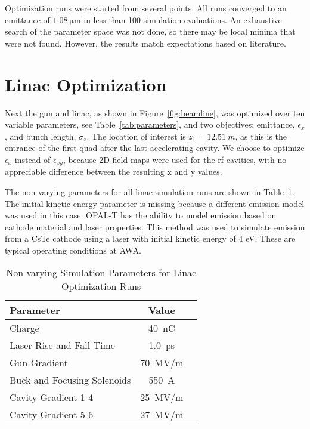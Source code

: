 \documentclass[letterpaper,  %
              ]{jacow}
\begin{document}
Optimization runs were started from several points. 
All runs converged to an emittance of 
$\SI{1.08}{\um}$ in less than 100 simulation evaluations. 
An exhaustive search of the parameter space was not done, 
so there may be local minima that were not found.
However, the results match expectations based on literature.

\section{Linac Optimization} 
Next the gun and linac, as shown in Figure~\ref{fig:beamline}, 
was optimized over ten variable parameters, see Table~\ref{tab:parameters}, 
and two objectives: emittance, $\epsilon_x$, and bunch length, $\sigma_z$. 
The location of interest is $z_1=\SI{12.51}{m}$, 
as this is the entrance of the first 
quad after the last accelerating cavity. 
We choose to optimize $\epsilon_x$
instead of $\epsilon_{xy}$, because 2D field maps were 
used for the rf cavities, with no appreciable 
difference between the resulting x and y values.

The non-varying parameters for all 
linac simulation runs are shown in Table~\ref{tab:linac}.
The initial kinetic energy parameter is missing because a different
emission model was used in this case. OPAL-T has the 
ability to model emission based on cathode material and laser
properties. This method was used to simulate emission
from a CsTe cathode using a laser with initial kinetic energy of 4 eV. 
These are typical operating conditions at AWA. 
\begin{table}[hbt] %
	\centering
	\begin{tabular}{l c c}
		\textbf{Parameter} & \textbf{Value} \\
		\hline %
		Charge  & \SI{40}{nC} \\
		Laser Rise and Fall Time & \SI{1.0}{ps} \\
		Gun Gradient & \SI{70}{MV/m} \\
		Buck and Focusing Solenoids & \SI{550}{A}\\
		Cavity Gradient 1-4 & \SI{25}{MV/m} \\
		Cavity Gradient 5-6 & \SI{27}{MV/m} \\
		
	\end{tabular}
	\caption{Non-varying Simulation Parameters for Linac Optimization Runs}
	\label{tab:linac}
\end{table}
\end{document}
